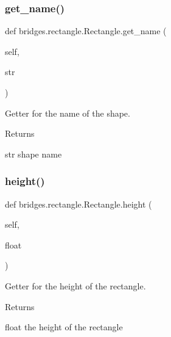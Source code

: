 \subsubsection{\texorpdfstring{get\+\_\+name()}{get\_name()}}
{\footnotesize\ttfamily def bridges.\+rectangle.\+Rectangle.\+get\+\_\+name (\begin{DoxyParamCaption}\item[{}]{self,  }\item[{}]{str }\end{DoxyParamCaption})}



Getter for the name of the shape. 

\begin{DoxyReturn}{Returns}


str shape name 
\end{DoxyReturn}
\mbox{\label{classbridges_1_1rectangle_1_1_rectangle_a74a2af961f5eb512ccd5f7faded6645c}} 
\subsubsection{\texorpdfstring{height()}{height()}\hspace{0.1cm}{\footnotesize\ttfamily [1/2]}}
{\footnotesize\ttfamily def bridges.\+rectangle.\+Rectangle.\+height (\begin{DoxyParamCaption}\item[{}]{self,  }\item[{}]{float }\end{DoxyParamCaption})}



Getter for the height of the rectangle. 

\begin{DoxyReturn}{Returns}


float the height of the rectangle 
\end{DoxyReturn}
\mbox{\label{classbridges_1_1rectangle_1_1_rectangle_ad150b377d0bc9f08c85f7f16643a6bf4}} 
